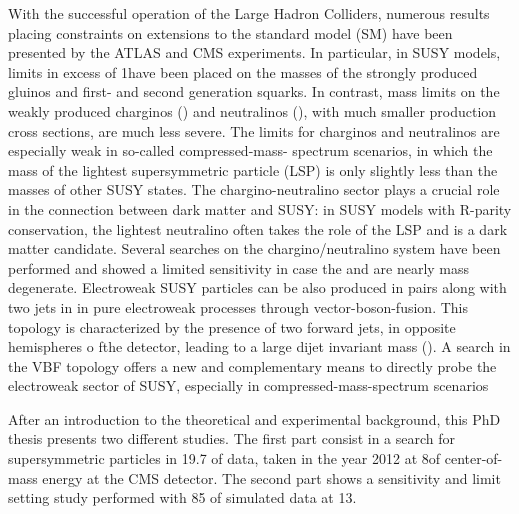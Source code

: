 With the successful operation of the Large Hadron Colliders, numerous results placing constraints on extensions to the standard model (SM) have been presented by the ATLAS and CMS experiments. In particular, in SUSY models, limits in excess of 1\tev have been placed on the masses of the strongly produced gluinos and first- and second generation squarks. In contrast, mass limits on the weakly produced charginos (\charginopm) and neutralinos (\neutralinotwo), with much smaller production cross sections, are much less severe. The limits for charginos and neutralinos are especially weak in so-called compressed-mass- spectrum scenarios, in which the mass of the lightest supersymmetric particle (LSP) is only slightly less than the masses of other SUSY states. The chargino-neutralino sector plays a crucial role in the connection between dark matter and SUSY: in SUSY models with R-parity conservation, the lightest neutralino \neutralinoone often takes the role of the LSP and is a dark matter candidate. Several searches on the chargino/neutralino system have been performed and showed a limited sensitivity in case the \charginopm and \neutralinotwo are nearly mass degenerate. Electroweak SUSY particles can be also produced in pairs along with two jets in in pure electroweak processes through vector-boson-fusion. This topology is characterized by the presence of two forward jets, in opposite hemispheres o fthe detector, leading to a large dijet invariant mass (\mjj). A search in the VBF topology offers a new and complementary means to directly probe the electroweak sector of SUSY, especially in compressed-mass-spectrum scenarios 

After an introduction to the theoretical and experimental background, this PhD thesis presents two different studies. The first part consist in a search for supersymmetric particles in 19.7 \invfb of data, taken in the year 2012 at 8\tev of center-of-mass energy at the CMS detector. The second part shows a sensitivity and limit setting study performed with 85 \invfb of simulated data at 13\tev.
